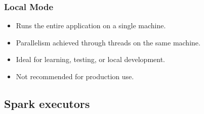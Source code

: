\begin{frame}
    \frametitle{Local Mode}
    \begin{itemize}
        \item Runs the entire application on a single machine.
        \item Parallelism achieved through threads on the same machine.
        \item Ideal for learning, testing, or local development.
        \item Not recommended for production use.
    \end{itemize}
\end{frame}


\subsection{Spark executors}\label{subsec:spark-executors}

